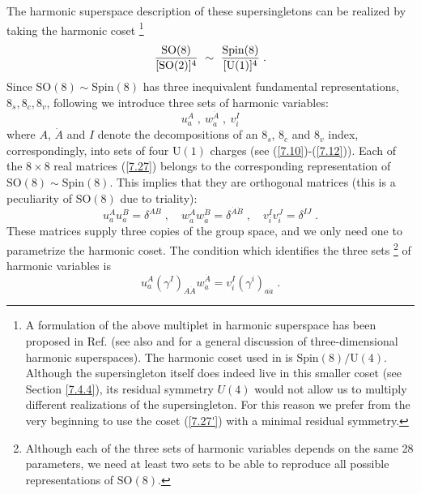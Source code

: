 \documentclass[a4paper,12pt]{article}
\begin{document}
The harmonic superspace description of these supersingletons can 
be realized by taking the harmonic coset \footnote{A formulation 
of the above multiplet in harmonic superspace has been proposed 
in Ref. \cite{Howe} (see also \cite{ZK} and \cite{HL} for a 
general discussion of three-dimensional harmonic superspaces). 
The harmonic coset used in \cite{Howe} is 
$\mbox{Spin}(8)/\mbox{U}(4)$. Although the supersingleton itself 
does indeed live in this smaller coset (see Section \ref{7.4.4}), 
its residual symmetry $U(4)$ would not allow us to multiply 
different realizations of the supersingleton. For this reason we 
prefer from the very beginning to use the coset (\ref{7.27'}) 
with a minimal residual symmetry.} 
\begin{equation}\label{7.27'}
  {\mbox{SO}(8)\over [\mbox{SO}(2)]^4} \ \sim \ {\mbox{Spin}(8)\over
 [\mbox{U}(1)]^4}\;.
\end{equation}  
Since $\mbox{SO}(8)\sim \mbox{Spin}(8)$  has three inequivalent 
fundamental representations, $8_s,8_c,8_v$, following  \cite{GHS} 
we introduce three sets of harmonic variables: 
\begin{equation}\label{7.27}
  u_a^A\;, \ w^{\dot A}_{\dot a}\;, \ v^I_i
\end{equation}
where $A$, $\dot A$ and $I$ denote the decompositions of an $8_s$, 
$8_c$ and $8_v$ index, correspondingly, into sets of four 
$\mbox{U}(1)$ charges (see (\ref{7.10})-(\ref{7.12})). Each of the 
$8\times 8$ real matrices (\ref{7.27}) belongs to the 
corresponding representation of $\mbox{SO}(8)\sim \mbox{Spin}(8)$. 
This implies that they are orthogonal matrices (this is a 
peculiarity of $\mbox{SO}(8)$ due to triality): 
\begin{equation}\label{7.28}
  u_a^A u_a^B = \delta^{AB}\;, \quad w^{\dot A}_{\dot a} w^{\dot B}_{\dot 
a}  = \delta^{\dot A\dot B}\;, \quad v^I_i v^J_i = \delta^{IJ} \;.
\end{equation}
These matrices supply three copies of the group space, and we only 
need one to parametrize the harmonic coset. The condition which 
identifies the three sets \footnote{Although each of the three 
sets of harmonic variables depends on the same 28 parameters, we 
need at least two sets to be able to reproduce all possible 
representations of $\mbox{SO}(8)$.} of harmonic variables is 
\begin{equation}\label{7.29}
  u_a^A (\gamma^I)_{A\dot A} w^{\dot A}_{\dot a} = v^I_i (\gamma^i)_{a\dot 
a}\;. 
\end{equation}
\end{document}
